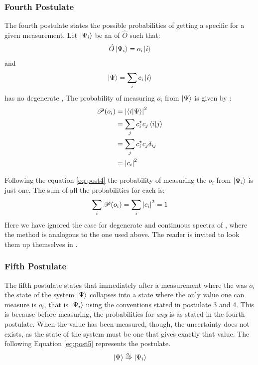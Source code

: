 \documentclass[../master_thesis.tex]{subfiles}
\begin{document}
\subsubsection{Fourth Postulate}
The fourth postulate states the possible probabilities of getting a specific
\eival for a given measurement.
Let $\ket{\Psi_i}$ be an \eifunc of $\hat{O}$ such that:
\begin{equation}
  \hat{O}\ket{\Psi_i} = o_i\ket{i}
\end{equation}
and
\begin{equation}
  \ket{\Psi} = \sum_i c_i \ket{i} \label{eq:lincomb}
\end{equation}
has no degenerate \eival,
The probability of measuring \eival  $o_i$ from $\ket{\Psi}$ is given by
\cite{Cohen:1973}:
\begin{align} \label{eq:post4}
  \begin{split}
    \mathscr{P}(o_i) &= \abs{\braket{i|\Psi}}^2\\
                     &= \sum_{j}c_i^\star c_j\braket{i|j}\\
                     &= \sum_{j}c_i^\star c_j\delta_{ij}\\
                     &= \abs{c_i}^2
  \end{split}
\end{align}

Following the equation \ref{eq:post4} the probability of measuring the
\eival $o_i$ from $\ket{\Psi_i}$ is just one. The sum of all the probabilities
for each \eival is:
\begin{equation}
  \sum_i\mathscr{P}(o_i) = \sum_i \abs{c_i}^2 = 1
\end{equation}
Here we have ignored the case for degenerate \eival and continuous spectra of
\eival, where the method is analogous to the one used above. The reader is
invited to look them up themselves in \cite{Cohen:1973, Atkins:2011}.

\subsubsection{Fifth Postulate}
The fifth postulate states that immediately after a measurement where the \eival was $o_i$
the state of the system $\ket{\Psi}$ collapses into a state where the only value one
can measure is $o_i$, that is $ \ket{\Psi_i} $ using the conventions stated in postulate 3 and 4.
This is because before measuring, the probabilities for \textit{any} \eival
is as stated in the fourth postulate. When the value has been measured, though,
the uncertainty does not exists, as the state of the system must be one that gives
exactly that value. The following Equation \ref{eq:post5} represents the postulate.
\begin{equation}\label{eq:post5}
  \ket{\Psi} \stackrel{o_i}{\Rightarrow} \ket{\Psi_i}
\end{equation}
\end{document}
